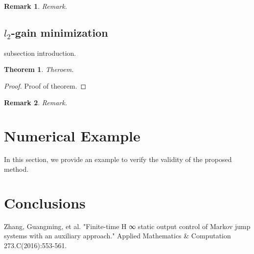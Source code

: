 \documentclass[conference]{IEEEtran}
\newtheorem{remark}{Remark}
\newtheorem{theorem}{Theorem}
\begin{document}
\begin{remark}
	Remark.
\end{remark}


\subsection{$l_2$-gain minimization}\label{minimization} 
	subsection introduction.

\begin{theorem}\label{theorem2}	
	Theroem.
\end{theorem}

\begin{proof} 
	Proof of theorem.
\end{proof}

\begin{remark}
	Remark.
\end{remark}

\section{Numerical Example} \label{example}
In this section, we provide an example to verify the validity of the proposed method.





\section{Conclusions} \label{conclusion}




%
%


\begin{thebibliography}{1}
	
	Zhang, Guangming, et al. "Finite-time H ∞ static output control of Markov jump systems with an auxiliary approach." Applied Mathematics \& Computation 273.C(2016):553-561.
	
\end{thebibliography}




\end{document}

